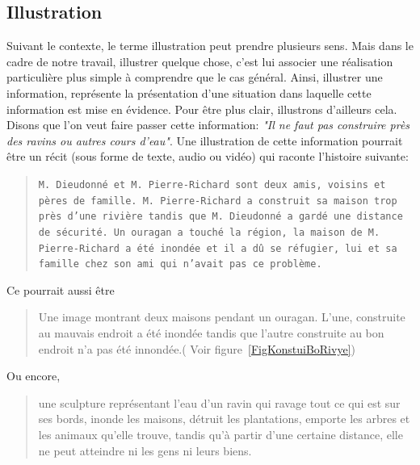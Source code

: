 \subsection{Illustration}
Suivant le contexte, le terme illustration peut prendre plusieurs sens. Mais dans le cadre de notre travail, illustrer quelque chose, c'est lui associer une r\'ealisation particuli\`ere plus simple \`a comprendre que le cas g\'en\'eral. Ainsi, illustrer une information, repr\'esente la pr\'esentation d'une situation dans laquelle cette information est mise en \'evidence. Pour \^etre plus clair, illustrons d'ailleurs cela.\\
Disons que l'on veut faire passer cette information: \emph{"Il ne faut pas construire pr\`es des ravins ou autres cours d'eau"}. Une illustration de cette information pourrait \^etre un r\'ecit (sous forme de texte, audio ou vid\'eo) qui raconte l'histoire suivante:
\begin{quotation}
	\texttt{M. Dieudonn\'e et M. Pierre-Richard sont deux amis, voisins et p\`eres de famille. M. Pierre-Richard a construit sa maison trop pr\`es d'une rivi\`ere tandis que M. Dieudonn\'e a gard\'e une distance de s\'ecurit\'e. Un ouragan a touch\'e la r\'egion, la maison de M. Pierre-Richard a \'et\'e inond\'ee et il a d\^u se r\'efugier, lui et sa famille chez son ami qui n'avait pas ce probl\`eme.}
\end{quotation}

\noindent Ce pourrait aussi \^etre
\begin{quotation}
	\ttfamily Une image montrant deux maisons pendant un ouragan. L'une, construite au mauvais endroit a \'et\'e inond\'ee tandis que l'autre construite au bon endroit n'a pas \'et\'e innond\'ee.( Voir figure~\ref{FigKonstuiBoRivye}) \normalfont

\end{quotation}

\noindent Ou encore,

\begin{quotation}
		\ttfamily une sculpture repr\'esentant l'eau d'un ravin qui ravage tout ce qui est sur ses bords, inonde les maisons, d\'etruit les plantations, emporte les arbres et les animaux qu'elle trouve, tandis qu'\`a partir d'une certaine distance, elle ne peut atteindre ni les gens ni leurs biens.\normalfont
\end{quotation}

